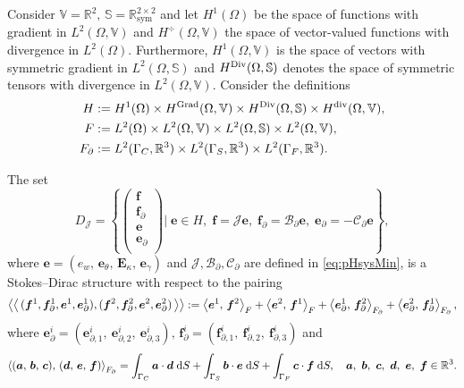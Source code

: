 \begin{conjecture}\label{conj:stdirMin}
Consider $\mathbb{V} = \mathbb{R}^2, \, \mathbb{S} = \mathbb{R}^{2\times 2}_{\text{sym}}$ and
let $H^{1}(\Omega)$ be the space of functions with gradient in $L^2(\Omega, \mathbb{V})$ and $H^{\div}  (\Omega, \mathbb{V})$ the space of vector-valued functions with divergence in $L^2(\Omega)$. Furthermore, $H^{1}(\Omega, \mathbb{V})$ is the space of vectors with symmetric gradient in $L^2(\Omega, \mathbb{S})$ and $H^{\Div}  (\Omega, \mathbb{S})$ denotes the space of symmetric tensors with divergence in $L^2(\Omega, \mathbb{V})$. Consider the definitions 
\begin{align*}
H &:= H^{1}(\Omega) \times H^{\Grad}(\Omega, \mathbb{V}) \times H^{\Div}(\Omega, \mathbb{S}) \times H^{\div}(\Omega, \mathbb{V}), \\
F &:= L^2(\Omega) \times L^2(\Omega, \mathbb{V}) \times L^2(\Omega, \mathbb{S}) \times L^2(\Omega, \mathbb{V}), \\
F_\partial &:= L^2(\Gamma_C, \mathbb{R}^3) \times L^2(\Gamma_S, \mathbb{R}^3) \times L^2(\Gamma_F, \mathbb{R}^3). 
\end{align*}

The set 
\begin{equation}
{D}_{\mathcal{J}} = \left\{
\begin{pmatrix}
\bm{f} \\ \bm{f}_\partial \\ \bm{e} \\ \bm{e}_\partial \\
\end{pmatrix}
\vert \;
\bm{e} \in H, \; \bm{f} = \mathcal{J} \bm{e}, \;\bm{f}_\partial = \mathcal{B}_\partial \bm{e}, \; \bm{e}_\partial = -\mathcal{C}_\partial \bm{e}   \right\},
\end{equation}
where $\bm{e} = ({e}_w, \,\bm{e}_\theta, \, \bm{E}_\kappa, \, \bm{e}_\gamma)$ and $\mathcal{J, B_\partial, C_\partial}$ are defined in \eqref{eq:pHsysMin}, is a Stokes–Dirac structure with respect to the pairing
\begin{equation}\label{eq:bilinearMin}
\bilprod{(\bm{f}^1, \bm{f}_{\partial}^1, \bm{e}^1, \bm{e}_{\partial}^1)}{(\bm{f}^2, \bm{f}_{\partial}^2, \bm{e}^2, \bm{e}_{\partial}^2)}  := \inner[F]{\bm{e}^1}{\bm{f}^2} + \inner[F]{\bm{e}^2}{\bm{f}^1} + \inner[F_\partial]{\bm{e}_{\partial}^1}{\bm{f}_{\partial}^2} + \inner[F_\partial]{\bm{e}_{\partial}^2}{\bm{f}_{\partial}^1},
\end{equation}
where $\bm{e}_{\partial}^i = (\bm{e}_{\partial, 1}^i, \ \bm{e}_{\partial, 2}^i, \ \bm{e}_{\partial, 3}^i), \, \bm{f}_{\partial}^i = (\bm{f}_{\partial, 1}^i, \ \bm{f}_{\partial, 2}^i, \ \bm{f}_{\partial, 3}^i)$ and
\begin{equation*}
\inner[F_\partial]{(\bm{a}, \, \bm{b}, \, \bm{c})}{(\bm{d}, \, \bm{e}, \, \bm{f})} = \int_{\Gamma_C} \bm{a} \cdot \bm{d} \d{S} + \int_{\Gamma_S} \bm{b} \cdot \bm{e} \d{S}  + \int_{\Gamma_F} \bm{c} \cdot \bm{f} \d{S}, \quad \bm{a},\ \bm{b},\ \bm{c},\ \bm{d},\ \bm{e},\ \bm{f} \in \mathbb{R}^3. 
\end{equation*}
\end{conjecture}

